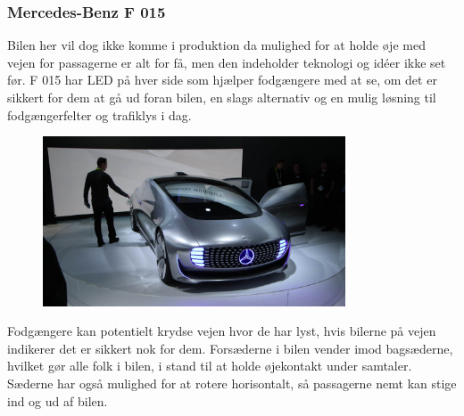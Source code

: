 \subsubsection{Mercedes-Benz F 015}
Bilen her vil dog ikke komme i produktion da mulighed for at holde øje med vejen for passagerne er alt for få, men den indeholder teknologi og idéer ikke set før. F 015 har LED på hver side som hjælper fodgængere med at se, om det er sikkert for dem at gå ud foran bilen, en slags alternativ og en mulig løsning til fodgængerfelter og trafiklys i dag.
\begin{figure}[h!]
	\centering
	\includegraphics[width=0.8\textwidth]{images/150106_0422_ces.jpg}{}
	\label{fig:Mercedes-Benz_F_015}
\end{figure}
Fodgængere kan potentielt krydse vejen hvor de har lyst, hvis bilerne på vejen indikerer det er sikkert nok for dem. Forsæderne i bilen vender imod bagsæderne, hvilket gør alle folk i bilen, i stand til at holde øjekontakt under samtaler. Sæderne har også mulighed for at rotere horisontalt, så passagerne nemt kan stige ind og ud af bilen.
